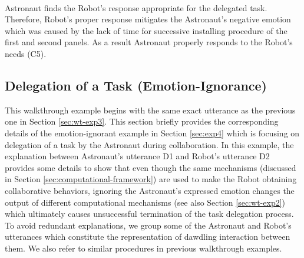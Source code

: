 \noindent{}\\

Astronaut finds the Robot's response appropriate for the delegated task.
Therefore, Robot's proper response mitigates the Astronaut's negative emotion
which was caused by the lack of time for successive installing procedure of the
first and second panels. As a result Astronaut properly responds to the Robot's
needs (C5).\\

\noindent{}

\subsection{Delegation of a Task (Emotion-Ignorance)}
\label{sec:wt-exp4}

This walkthrough example begins with the same exact utterance as the previous
one in Section \ref{sec:wt-exp3}. This section briefly provides the
corresponding details of the emotion-ignorant example in Section \ref{sec:exp4}
which is focusing on delegation of a task by the Astronaut during collaboration.
In this example, the explanation between Astronaut's utterance D1 and Robot's
utterance D2 provides some details to show that even though the same mechanisms
(discussed in Section \ref{sec:computational-framework}) are used to make the
Robot obtaining collaborative behaviors, ignoring the Astronaut's expressed
emotion changes the output of different computational mechanisms (see also
Section \ref{sec:wt-exp2}) which ultimately causes unsuccessful termination of
the task delegation process. To avoid redundant explanations, we group some of
the Astronaut and Robot's utterances which constitute the representation of
dawdling interaction between them. We also refer to similar procedures in
previous walkthrough examples.\\

\noindent{}\\

